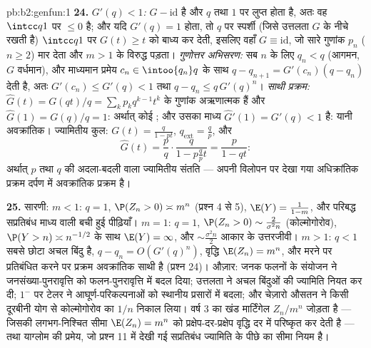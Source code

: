 \begin{solution}{pb:b2:genfun:1}
\textbf{24.} \emph{$G'(q) < 1$:} $G - \mathrm{id}$  है और $q$ तथा $1$ पर लुप्त होता
है, अतः वह $\intcc
q1$ पर $\leq 0$ है; और यदि $G'(q) = 1$ होता, तो $q$ पर स्पर्शी (जिसे
उत्तलता $G$ के नीचे रखती है) $\intcc q1$ पर $G(t) \geq t$ को बाध्य कर देती,
इसलिए वहाँ $G \equiv \mathrm{id}$, जो सारे गुणांक $p_n$ ($n \geq 2$) मार देता और $m > 1$ के
विरुद्ध पड़ता। \emph{गुणोत्तर अभिसरण:} सब $n$ के लिए $q_n < q$ (आगमन,
$G$ वर्धमान), और माध्यमान प्रमेय $c_n \in \intoo{q_n}q$ के साथ $q - q_{n+1} =
G'(c_n)(q - q_n)$ देती है, अतः
$G'(c_n)
\leq G'(q) < 1$ तथा $q - q_n \leq q\,G'(q)^n$। \emph{साथी प्रक्रम:} $\widehat G(t) = G(qt)/q =
\sum_kp_kq^{k-1}t^k$ के गुणांक अऋणात्मक हैं और
$\widehat G(1) = G(q)/q = 1$: अर्थात् कोई ; और उसका माध्य $\widehat
G'(1) = G'(q) < 1$ है: यानी
अवक्रांतिक। ज्यामितीय कुल: $G(t) =
\frac{q}{1-pt}$, $q_{\mathrm{ext}} = \frac qp$, और
\[
\widehat G(t) = \frac pq\cdot\frac{q}{1 - p\frac qp t}
= \frac{p}{1 - qt} :
\]
अर्थात् $p$ तथा $q$ की अदला-बदली वाला ज्यामितीय संतति  ---
अपनी विलोपन  पर देखा गया अधिक्रांतिक प्रक्रम दर्पण में
अवक्रांतिक प्रक्रम है।

\textbf{25.} सारणी: $m < 1$: $q = 1$, $\P(Z_n > 0)
\asymp m^n$ (प्रश्न 4 से 5), $\E(Y) = \frac1{1-m}$, और परिबद्ध
सप्रतिबंध माध्य वाली बची हुई पीढ़ियाँ। $m = 1$: $q = 1$, $\P(Z_n > 0) \sim \frac2{\sigma^2n}$
(कोल्मोगोरोव), $\P(Y > n) \asymp n^{-1/2}$ के साथ $\E(Y) = \infty$, और $\sim \frac{\sigma^2n}2$ आकार के उत्तरजीवी। $m > 1$:
$q < 1$ सबसे छोटा अचल बिंदु है, $q - q_n = O(G'(q)^n)$, वृद्धि $\E(Z_n) = m^n$, और मरने पर
प्रतिबंधित करने पर प्रक्रम अवक्रांतिक साथी है (प्रश्न 24)। औज़ार:
जनक फलनों के संयोजन ने जनसंख्या-पुनरावृत्ति को फलन-पुनरावृत्ति में
बदल दिया; उत्तलता ने अचल बिंदुओं की ज्यामिति नियत कर दी; $1^-$ पर
टेलर ने आघूर्ण-परिकल्पनाओं को स्थानीय प्रसारों में बदला; और चेज़ारो
औसतन ने किसी दूरबीनी योग से कोल्मोगोरोव का $1/n$ निकाल लिया। वर्ष 3
का खंड मार्टिंगेल $Z_n/
m^n$ जोड़ता है --- जिसकी लगभग-निश्चित सीमा $\E(Z_n) = m^n$
को प्रक्षेप-दर-प्रक्षेप वृद्धि दर में परिष्कृत कर देती है --- तथा
याग्लोम की प्रमेय, जो प्रश्न 11 में देखी गई सप्रतिबंध ज्यामिति के
पीछे का सीमा नियम है।
\end{solution}
